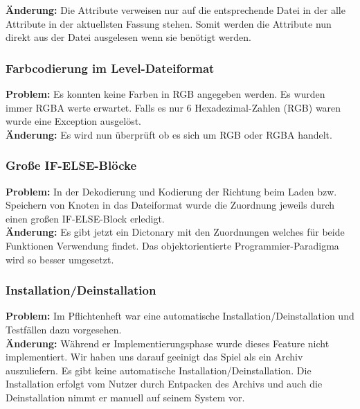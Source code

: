 \textbf{Änderung:} Die Attribute verweisen nur auf die entsprechende Datei in der alle Attribute in der aktuellsten Fassung stehen. Somit werden die Attribute nun direkt aus der Datei ausgelesen wenn sie benötigt werden.\\



\subsubsection*{Farbcodierung im Level-Dateiformat}

\textbf{Problem:}
Es konnten keine Farben in RGB angegeben werden. Es wurden immer RGBA werte erwartet.
Falls es nur 6 Hexadezimal-Zahlen (RGB) waren wurde eine Exception ausgelöst.\\

\textbf{Änderung:} Es wird nun überprüft ob es sich um RGB oder RGBA handelt.\\



\subsubsection*{Große IF-ELSE-Blöcke}
\textbf{Problem:}
In der Dekodierung und Kodierung der Richtung beim Laden bzw. Speichern von Knoten in das Dateiformat wurde die Zuordnung jeweils durch einen großen IF-ELSE-Block erledigt.\\

\textbf{Änderung:} Es gibt jetzt ein Dictonary mit den Zuordnungen welches für beide Funktionen Verwendung findet. Das objektorientierte Programmier-Paradigma wird so besser umgesetzt.\\



\subsubsection*{Installation/Deinstallation}
\textbf{Problem:} Im Pflichtenheft war eine automatische Installation/Deinstallation und Testfällen dazu vorgesehen.\\

\textbf{Änderung:} Während er Implementierungsphase wurde dieses Feature nicht implementiert. Wir haben uns darauf geeinigt das Spiel als ein Archiv auszuliefern. Es gibt keine automatische Installation/Deinstallation. Die Installation erfolgt vom Nutzer durch Entpacken des Archivs und auch die Deinstallation nimmt er manuell auf seinem System vor.\\


